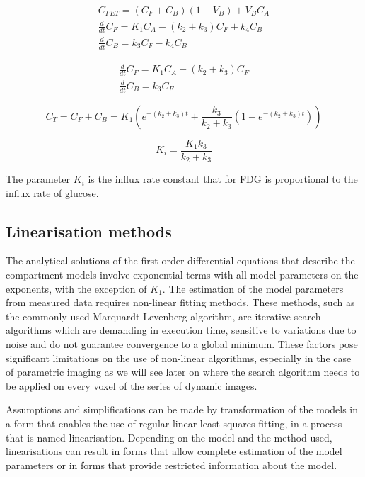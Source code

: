 \begin{subequations}
\begin{align}
C_{PET} = (C_F + C_B)(1-V_B) + V_B C_A \\
\frac{d}{dt}C_F = K_1 C_A - (k_2 + k_3)C_F + k_4 C_B \\ 
\frac{d}{dt}C_B = k_3 C_F - k_4 C_B  
\end{align}
\label{eqn:2TCM_Diff}
\end{subequations}

\begin{subequations}
\begin{align}
\frac{d}{dt}C_F = K_1 C_A - (k_2 + k_3)C_F \\ 
\frac{d}{dt}C_B = k_3 C_F  
\end{align}
\label{eqn:2TCM_Diff_k4=0}
\end{subequations}

\begin{equation}
C_T =  C_F + C_B = K_1 ( e^{-(k_2+k_3)t} + \frac{k_3}{k_2+k_3}(1-e^{-(k_2+k_3)t}))   
\label{eqn:2TCM}
\end{equation}

\begin{equation}
K_i = \frac{K_1 k_3}{k_2+k_3}
\label{eqn:FDG_Ki}
\end{equation}

The parameter $K_i$ is the influx rate constant that for FDG is proportional to the influx rate of glucose. 

\subsection{Linearisation methods}
The analytical solutions of the first order differential equations that describe the compartment models involve exponential terms with all model parameters on the exponents, with the exception of $K_1$. The estimation of the model parameters from measured data requires non-linear fitting methods. These methods, such as the commonly used Marquardt-Levenberg algorithm, are iterative search algorithms which are demanding in execution time, sensitive to variations due to noise and do not guarantee convergence to a global minimum. These factors pose significant limitations on the use of non-linear algorithms, especially in the case of parametric imaging as we will see later on where the search algorithm needs to be applied on every voxel of the series of dynamic images.\par
Assumptions and simplifications can be made by transformation of the models in a form that enables the use of regular linear least-squares fitting, in a process that is named linearisation. Depending on the model and the method used, linearisations can result in forms that allow complete estimation of the model parameters or in forms that provide restricted information about the model. 

